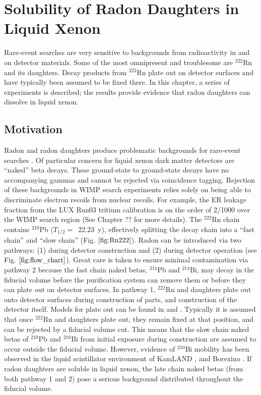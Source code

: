 \chapter{Solubility of Radon Daughters in Liquid Xenon}\label{ch:radon} %
Rare-event searches are very sensitive to backgrounds from radioactivity in and on detector materials. Some of the most omnipresent and troublesome are $^{222}$Rn and its daughters. Decay products from $^{222}$Rn plate out on detector surfaces and have typically been assumed to be fixed there. In this chapter, a series of experiments is described; the results provide evidence that radon daughters can dissolve in liquid xenon.

\section{Motivation}
Radon and radon daughters produce problematic backgrounds for rare-event searches \cite{LUXFirstResults}. Of particular concern for liquid xenon dark matter detectors are ``naked'' beta decays. These ground-state to ground-state decays have no accompanying gammas and cannot be rejected via coincidence tagging. Rejection of these backgrounds in WIMP search experiments relies solely on being able to discriminate electron recoils from nuclear recoils. For example, the \ac{ER} leakage fraction from the LUX Run03 tritium calibration is on the order of 2/1000 over the WIMP search region \cite{LUX:Tritium} (See Chapter ?? for more details).  The $^{222}$Rn chain contains $^{210}$Pb ($T_{1/2} = $~22.23~y), effectively splitting the decay chain into a ``fast chain'' and ``slow chain'' (Fig. $\ref{fig:Rn222}$). Radon can be introduced via two pathways: (1) during detector construction and (2) during detector operation (see Fig. $\ref{fig:flow_chart}$). Great care is taken to ensure minimal contamination via pathway 2 because the fast chain naked betas, $^{214}$Pb and $^{214}$Bi, may decay in the fiducial volume before the purification system can remove them or before they can plate out on detector surfaces. In pathway 1, $^{222}$Rn and daughters plate out onto detector surfaces during construction of parts, and construction of the detector itself. Models for plate out can be found in \cite{Guiseppe:2011mj} and \cite{Knutson:1988}. Typically it is assumed that once $^{222}$Rn and daughters plate out, they remain fixed at that position, and can be rejected by a fiducial volume cut. This means that the slow chain naked betas of $^{210}$Pb and $^{210}$Bi from initial exposure during construction are assumed to occur outside the fiducial volume. However, evidence of $^{210}$Bi mobility has been observed in the liquid scintillator environment of KamLAND  \cite{Takemoto:2015gta}, \cite{Gando:2014wjd} and Borexino \cite{Bellini:2013lnn}. If radon daughters are soluble in liquid xenon, the late chain naked betas (from both pathway 1 and 2) pose a serious background distributed throughout the fiducial volume.


